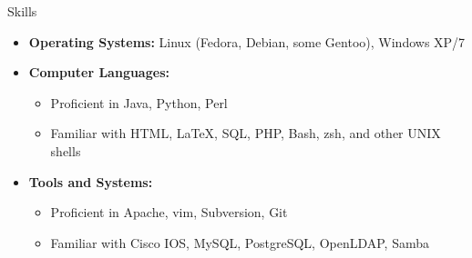\documentclass[11pt,oneside]{article}
\newenvironment{ressection}[1]{
	\vspace{4pt}
	{\fontfamily{phv}\selectfont\Large#1}
	\begin{itemize}
	\vspace{3pt}
}{
	\end{itemize}
}
\newcommand{\resitem}[1]{
	\vspace{-4pt}
	\item \begin{flushleft} #1 \end{flushleft}
}
\newcommand{\ressubitem}[1]{
	\vspace{-1pt}
	\item \begin{flushleft} #1 \end{flushleft}
}
\newenvironment{reslist}[1]{
	\resitem{\textbf{#1}}
	\vspace{-5pt}
	\begin{itemize}
}{
	\end{itemize}
}
\begin{document}
\begin{ressection}{Skills}

	\resitem{\textbf{Operating Systems:} Linux (Fedora, Debian, some Gentoo), Windows XP/7}

	\begin{reslist}{Computer Languages:}

		\ressubitem{Proficient in Java, Python, Perl}

		\ressubitem{Familiar with HTML, \LaTeX, SQL, PHP, Bash, zsh, and other UNIX shells}

	\end{reslist}

	\begin{reslist}{Tools and Systems:}

		\ressubitem{Proficient in Apache, vim, Subversion, Git}

		\ressubitem{Familiar with Cisco IOS, MySQL, PostgreSQL, OpenLDAP, Samba}

	\end{reslist}


\end{ressection}


\end{document}
